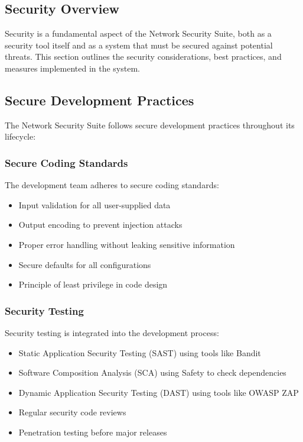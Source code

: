 \subsection{Security Overview}
Security is a fundamental aspect of the Network Security Suite, both as a security tool itself and as a system that must be secured against potential threats. This section outlines the security considerations, best practices, and measures implemented in the system.

\subsection{Secure Development Practices}
The Network Security Suite follows secure development practices throughout its lifecycle:

\subsubsection{Secure Coding Standards}
The development team adheres to secure coding standards:

\begin{itemize}
    \item Input validation for all user-supplied data
    \item Output encoding to prevent injection attacks
    \item Proper error handling without leaking sensitive information
    \item Secure defaults for all configurations
    \item Principle of least privilege in code design
\end{itemize}

\subsubsection{Security Testing}
Security testing is integrated into the development process:

\begin{itemize}
    \item Static Application Security Testing (SAST) using tools like Bandit
    \item Software Composition Analysis (SCA) using Safety to check dependencies
    \item Dynamic Application Security Testing (DAST) using tools like OWASP ZAP
    \item Regular security code reviews
    \item Penetration testing before major releases
\end{itemize}

